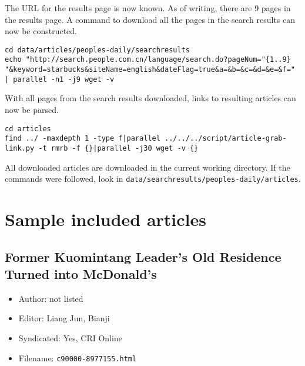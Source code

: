 The URL for the results page is now known. As of writing, there are 9 pages in
the results page. A command to download all the pages in the search results can
now be constructed.
\begin{verbatim}
cd data/articles/peoples-daily/searchresults
echo "http://search.people.com.cn/language/search.do?pageNum="{1..9}
"&keyword=starbucks&siteName=english&dateFlag=true&a=&b=&c=&d=&e=&f="
| parallel -n1 -j9 wget -v
\end{verbatim}
With all pages from the search results downloaded, links to resulting articles
can now be parsed.
\begin{verbatim}
cd articles
find ../ -maxdepth 1 -type f|parallel ../../../script/article-grab-link.py -t rmrb -f {}|parallel -j30 wget -v {}
\end{verbatim}
All downloaded articles are downloaded in the current working directory. If the
commands were followed, look in
\texttt{data/searchresults/peoples-daily/articles}.

\chapter{Sample included articles}\label{appdx:news-articles-inc}

\section{Former Kuomintang Leader's Old Residence Turned into
McDonald's}

\begin{itemize}
	\item Author: not listed
	\item Editor: Liang Jun, Bianji
	\item Syndicated: Yes, CRI Online
	\item Filename: \texttt{c90000-8977155.html}
\end{itemize}

